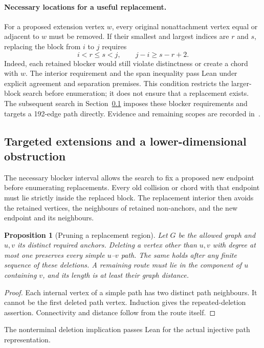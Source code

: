 \documentclass[11pt,a4paper]{article}
\newtheorem{proposition}[theorem]{Proposition}
\theoremstyle{definition}
\theoremstyle{remark}
\begin{document}
\paragraph{Necessary locations for a useful replacement.}
For a proposed extension vertex $w$, every original nonattachment
vertex equal or adjacent to $w$ must be removed. If their smallest
and largest indices are $r$ and $s$, replacing the block from $i$ to
$j$ requires
\[
i<r\le s<j,\qquad j-i\ge s-r+2.
\]
Indeed, each retained blocker would still violate distinctness or
create a chord with $w$. The interior requirement and the span
inequality pass Lean under explicit agreement and separation premises.
This condition restricts the larger-block search before enumeration;
it does not ensure that a replacement exists. The subsequent search in
Section~\ref{sec:target194} imposes these blocker requirements and targets
a 192-edge path directly. Evidence and remaining scopes are recorded
in~\cite{block193archive}.


\subsection{Targeted extensions and a lower-dimensional obstruction}
\label{sec:target194}
The necessary blocker interval allows the search to fix a proposed new
endpoint before enumerating replacements. Every old collision or chord
with that endpoint must lie strictly inside the replaced block. The
replacement interior then avoids the retained vertices, the neighbours
of retained non-anchors, and the new endpoint and its neighbours.

\begin{proposition}[Pruning a replacement region]
Let $G$ be the allowed graph and $u,v$ its distinct required anchors.
Deleting a vertex other than $u,v$ with degree at most one preserves
every simple $u$--$v$ path. The same holds after any finite sequence
of these deletions. A remaining route must lie in the component of
$u$ containing $v$, and its length is at least their graph distance.
\end{proposition}
\begin{proof}
Each internal vertex of a simple path has two distinct path neighbours.
It cannot be the first deleted path vertex. Induction gives the
repeated-deletion assertion. Connectivity and distance follow from
the route itself.
\end{proof}
The nonterminal deletion implication passes Lean for the actual
injective path representation.
\end{document}
